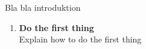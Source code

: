 \documentclass[a4paper]{article}
\begin{document}

Bla bla introduktion

\begin{enumerate}
\item \textbf{Do the first thing}\\
Explain how to do the first thing



\end{enumerate}
\end{document}
